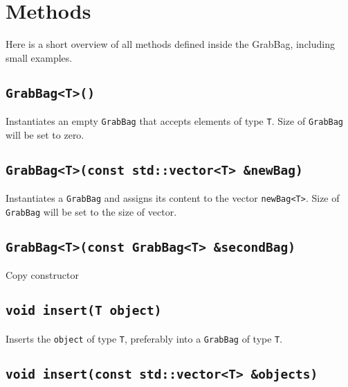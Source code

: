 \documentclass[a4paper,12pt]{article}
\begin{document}
\newpage
  
\section{Methods}

Here is a short overview of all methods defined inside the GrabBag, including small examples.


\subsection{\texttt{GrabBag<T>()}}

Instantiates an empty \texttt{GrabBag} that accepts elements of type \texttt{T}. 
Size of \texttt{GrabBag} will be set to zero.

 

\subsection{\texttt{GrabBag<T>(const std::vector<T> \&newBag)}}

Instantiates a \texttt{GrabBag} and assigns its content to the vector \texttt{newBag<T>}. 
Size of \texttt{GrabBag} will be set to the size of vector.

 

\newpage

\subsection{\texttt{GrabBag<T>(const GrabBag<T> \&secondBag)}}

Copy constructor



\subsection{\texttt{void insert(T object)}}

Inserts the \texttt{object} of type \texttt{T}, preferably into a \texttt{GrabBag} of type \texttt{T}.

 

\newpage

\subsection{\texttt{void insert(const std::vector<T> \&objects)}}
\end{document}
